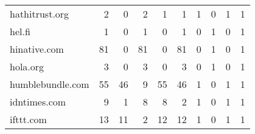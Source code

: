 \begin{tabular}{lrrrrrrrrr}
             hathitrust.org &                                2 &                                  0 &                                      2 &                            1 &                           1 &                                   1 &                                      0 &                             1 &                            1 \\
                     hel.fi &                                1 &                                  0 &                                      1 &                            0 &                           1 &                                   0 &                                      1 &                             0 &                            1 \\
               hinative.com &                               81 &                                  0 &                                     81 &                            0 &                          81 &                                   0 &                                      1 &                             0 &                            1 \\
                   hola.org &                                3 &                                  0 &                                      3 &                            0 &                           3 &                                   0 &                                      1 &                             0 &                            1 \\
           humblebundle.com &                               55 &                                 46 &                                      9 &                           55 &                          46 &                                   1 &                                      0 &                             1 &                            1 \\
               idntimes.com &                                9 &                                  1 &                                      8 &                            8 &                           2 &                                   1 &                                      0 &                             1 &                            1 \\
                  ifttt.com &                               13 &                                 11 &                                      2 &                           12 &                          12 &                                   1 &                                      0 &                             1 &                            1 \\

\end{tabular}
